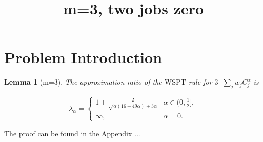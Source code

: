 \documentclass[11pt]{article}
\newtheorem{lemma}{Lemma}
\begin{document}
\title{m=3, two jobs zero}
\author{}
\date{}
\maketitle

\section{Problem Introduction} 

\begin{lemma}[m=3]

    The approximation ratio of the $\mathrm{WSPT}$-rule for $3||\sum_{j} w_j C^{\alpha}_j$ is

   \[
\lambda_{\alpha}
=
\begin{cases}
1+
\frac{2}{\sqrt{\alpha(16+49\alpha)}+3\alpha} & \alpha\in (0,\frac12],\\[1.2ex]
\infty,
& \alpha=0.
\end{cases}
\]
\end{lemma}


The proof can be found in the Appendix ...
\end{document}
